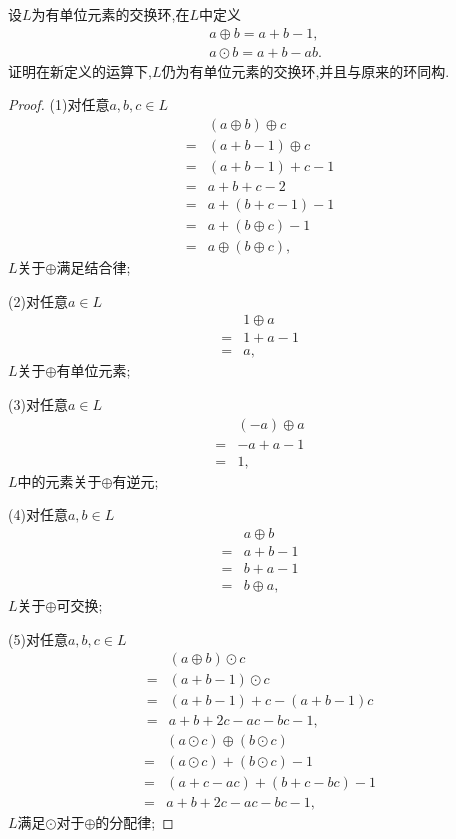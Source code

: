 \begin{problem}[P56T29]
    设$L$为有单位元素的交换环,在$L$中定义\begin{align*}
        &a\oplus b=a+b-1,\\
        &a\odot b=a+b-ab.
    \end{align*}证明在新定义的运算下,$L$仍为有单位元素的交换环,并且与原来的环同构.
\end{problem}
\begin{proof}
    (1)对任意$a,b,c\in L$\begin{align*}
        &(a\oplus b)\oplus c\\
        =&(a+b-1)\oplus c\\
        =&(a+b-1)+c-1\\
        =&a+b+c-2\\
        =&a+(b+c-1)-1\\
        =&a+(b\oplus c)-1\\
        =&a\oplus(b\oplus c),
    \end{align*}$L$关于$\oplus$满足结合律;

    (2)对任意$a\in L$\begin{align*}
        &1\oplus a\\
        =&1+a-1\\
        =&a,
    \end{align*}$L$关于$\oplus$有单位元素;

    (3)对任意$a\in L$\begin{align*}
        &(-a)\oplus a\\
        =&-a+a-1\\
        =&1,
    \end{align*}$L$中的元素关于$\oplus$有逆元;

    (4)对任意$a,b\in L$\begin{align*}
        &a\oplus b\\
        =&a+b-1\\
        =&b+a-1\\
        =&b\oplus a,
    \end{align*}$L$关于$\oplus$可交换;

    (5)对任意$a,b,c\in L$\begin{align*}
        &(a\oplus b)\odot c\\
        =&(a+b-1)\odot c\\
        =&(a+b-1)+c-(a+b-1)c\\
        =&a+b+2c-ac-bc-1,
    \end{align*}\begin{align*}
        &(a\odot c)\oplus(b\odot c)\\
        =&(a\odot c)+(b\odot c)-1\\
        =&(a+c-ac)+(b+c-bc)-1\\
        =&a+b+2c-ac-bc-1,
    \end{align*}$L$满足$\odot$对于$\oplus$的分配律;


\end{proof}
